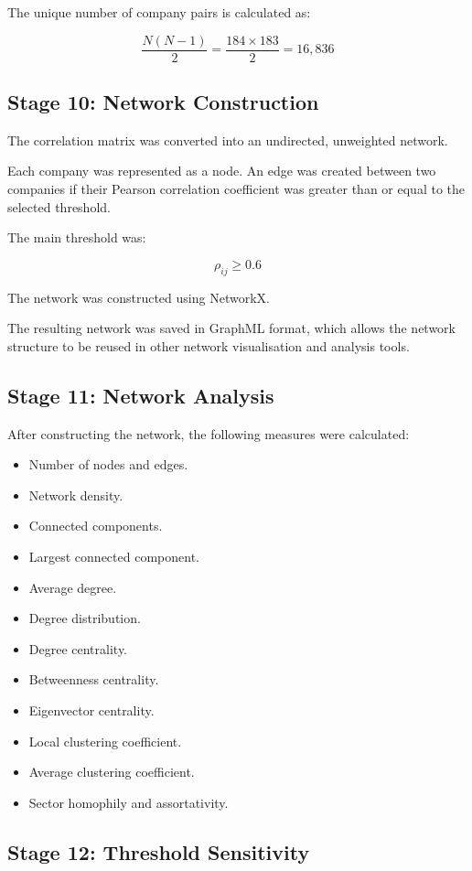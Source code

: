 \documentclass[11pt,a4paper]{article}
\begin{document}
The unique number of company pairs is calculated as:

\[
\frac{N(N-1)}{2}
=
\frac{184 \times 183}{2}
=
16,836
\]

\subsection{Stage 10: Network Construction}

The correlation matrix was converted into an undirected,
unweighted network.

Each company was represented as a node. An edge was created
between two companies if their Pearson correlation coefficient
was greater than or equal to the selected threshold.

The main threshold was:

\[
\rho_{ij} \geq 0.6
\]

The network was constructed using NetworkX.

The resulting network was saved in GraphML format, which
allows the network structure to be reused in other network
visualisation and analysis tools.

\subsection{Stage 11: Network Analysis}

After constructing the network, the following measures
were calculated:

\begin{itemize}
    \item Number of nodes and edges.
    \item Network density.
    \item Connected components.
    \item Largest connected component.
    \item Average degree.
    \item Degree distribution.
    \item Degree centrality.
    \item Betweenness centrality.
    \item Eigenvector centrality.
    \item Local clustering coefficient.
    \item Average clustering coefficient.
    \item Sector homophily and assortativity.
\end{itemize}

\subsection{Stage 12: Threshold Sensitivity}
\end{document}
